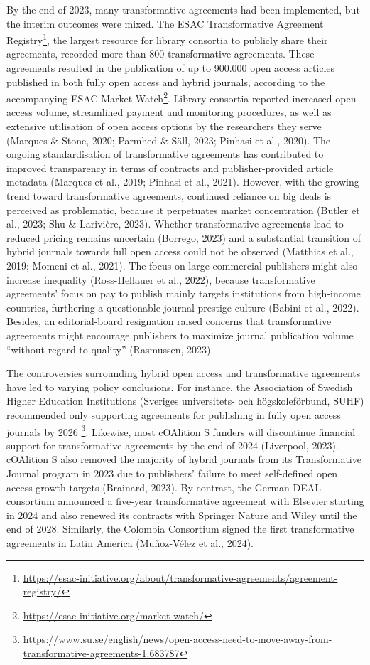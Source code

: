 \documentclass[a4paper,man,floatsintext,longtable,noextraspace,12pt]{apa6}
\begin{document}
By the end of 2023, many transformative agreements had been implemented,
but the interim outcomes were mixed. The ESAC Transformative Agreement
Registry\footnote{\url{https://esac-initiative.org/about/transformative-agreements/agreement-registry/}},
the largest resource for library consortia to publicly share their
agreements, recorded more than 800 transformative agreements. These
agreements resulted in the publication of up to 900.000 open access
articles published in both fully open access and hybrid journals,
according to the accompanying ESAC Market Watch\footnote{\url{https://esac-initiative.org/market-watch/}}.
Library consortia reported increased open access volume, streamlined
payment and monitoring procedures, as well as extensive utilisation of
open access options by the researchers they serve (Marques \& Stone,
2020; Parmhed \& Säll, 2023; Pinhasi et al., 2020). The ongoing
standardisation of transformative agreements has contributed to improved
transparency in terms of contracts and publisher-provided article
metadata (Marques et al., 2019; Pinhasi et al., 2021). However, with the
growing trend toward transformative agreements, continued reliance on
big deals is perceived as problematic, because it perpetuates market
concentration (Butler et al., 2023; Shu \& Larivière, 2023). Whether
transformative agreements lead to reduced pricing remains uncertain
(Borrego, 2023) and a substantial transition of hybrid journals towards
full open access could not be observed (Matthias et al., 2019; Momeni et
al., 2021). The focus on large commercial publishers might also increase
inequality (Ross-Hellauer et al., 2022), because transformative
agreements' focus on pay to publish mainly targets institutions from
high-income countries, furthering a questionable journal prestige
culture (Babini et al., 2022). Besides, an editorial-board resignation
raised concerns that transformative agreements might encourage
publishers to maximize journal publication volume ``without regard to
quality'' (Rasmussen, 2023).

The controversies surrounding hybrid open access and transformative
agreements have led to varying policy conclusions. For instance, the
Association of Swedish Higher Education Institutions (Sveriges
universitets- och högskoleförbund, SUHF) recommended only supporting
agreements for publishing in fully open access journals by 2026
\footnote{\url{https://www.su.se/english/news/open-access-need-to-move-away-from-transformative-agreements-1.683787}}.
Likewise, most cOAlition S funders will discontinue financial support
for transformative agreements by the end of 2024 (Liverpool, 2023).
cOAlition S also removed the majority of hybrid journals from its
Transformative Journal program in 2023 due to publishers' failure to
meet self-defined open access growth targets (Brainard, 2023). By
contrast, the German DEAL consortium announced a five-year
transformative agreement with Elsevier starting in 2024 and also renewed
its contracts with Springer Nature and Wiley until the end of 2028.
Similarly, the Colombia Consortium signed the first transformative
agreements in Latin America (Muñoz-Vélez et al., 2024).
\end{document}
